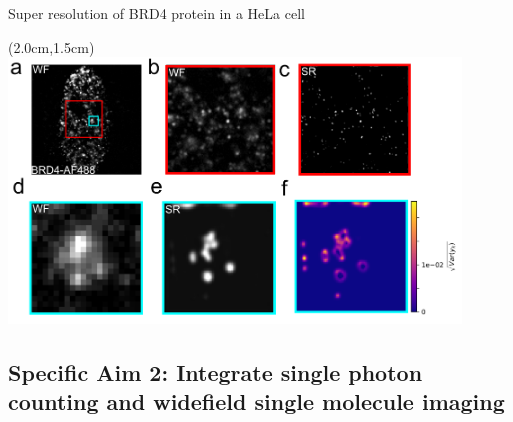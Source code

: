 \documentclass{beamer}					%
\begin{document}

\begin{frame}{Super resolution of BRD4 protein in a HeLa cell}
\begin{textblock*}{12cm}(2.0cm,1.5cm)
\includegraphics[width=12cm]{../../ddpm/ddpm/media/BRD4/Deep2.png}
\end{textblock*}


\end{frame}

\subsection{Specific Aim 2: Integrate single photon counting and widefield single molecule imaging}
\end{document}
